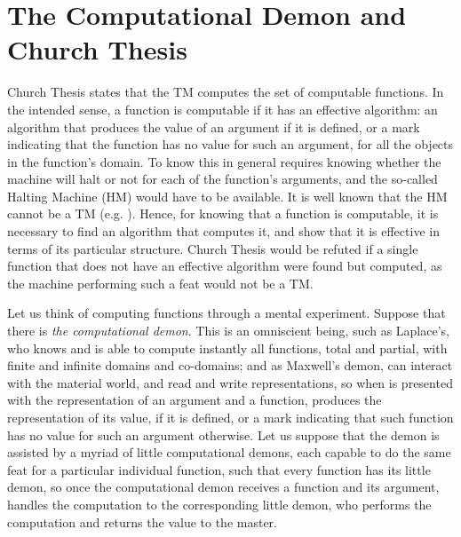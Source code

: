 \documentclass[11pt]{article}
\begin{document}
\section{The Computational Demon and Church Thesis}
\label{sec:thesis}

Church Thesis states that the TM computes the set of computable functions. In the intended sense, a function is computable if it has an effective algorithm: an algorithm that produces the value of an argument if it is defined, or a mark indicating that the function has no value for such an argument, for all the objects in the function's domain. To know this in general requires knowing whether the machine will halt or not for each of the function's arguments, and the so-called Halting Machine (HM) would have to be available. It is well known that the HM cannot be a TM (e.g. \cite{boolos-jeffrey-1989}). Hence, for knowing that a function is computable, it is necessary to find an algorithm that computes it, and show that it is effective in terms of its particular structure. Church Thesis would be refuted if a single function that does not have an effective algorithm were found but computed, as the machine performing such a feat would not be a TM. 

Let us think of computing functions through a mental experiment. Suppose that there is \emph{the computational demon}. This is an omniscient being, such as Laplace's, who knows and is able to compute instantly all functions, total and partial, with finite and infinite domains and co-domains; and as Maxwell's demon, can interact with the material world, and read and write representations, so when is presented with the representation of an argument and a function, produces the representation of its value, if it is defined, or a mark indicating that such function has no value for such an argument otherwise. Let us suppose that the demon is assisted by a myriad of little computational demons, each capable to do the same feat for a particular individual function, such that every function has its little demon, so once the computational demon receives a function and its argument, handles the computation to the corresponding little demon, who performs the computation and returns the value to the master.
\end{document}
